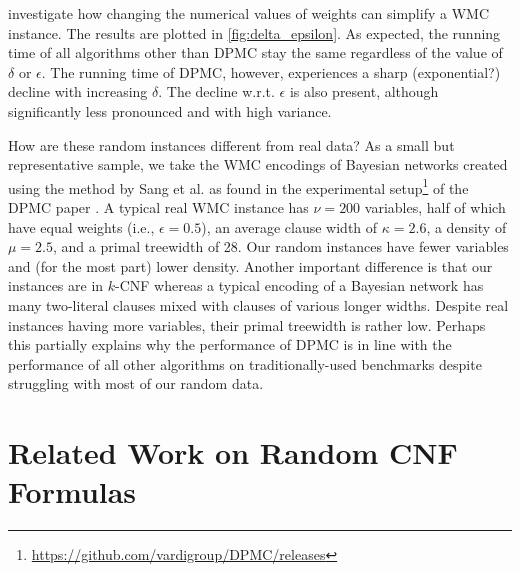 \documentclass{article}
\theoremstyle{definition}
\theoremstyle{remark}
\begin{document}
 investigate how changing the numerical values of
weights can simplify a \textsf{WMC} instance. The results are plotted in
\cref{fig:delta_epsilon}. As expected, the running time of all algorithms other
than \textsc{DPMC} \cite{DBLP:conf/cp/DudekPV20} stay the same regardless of the
value of $\delta$ or $\epsilon$. The running time of \textsc{DPMC}, however,
experiences a sharp (exponential?) decline with increasing $\delta$. The decline
w.r.t. $\epsilon$ is also present, although significantly less
pronounced and with high variance.

How are these random instances different from real data? As a small but
representative sample, we take the \textsf{WMC} encodings of Bayesian networks
created using the method by Sang et al. \cite{DBLP:conf/aaai/SangBK05} as found
in the experimental
setup\footnote{\url{https://github.com/vardigroup/DPMC/releases}} of the
\textsc{DPMC} paper \cite{DBLP:conf/cp/DudekPV20}. A typical real \textsf{WMC}
instance has $\nu = 200$ variables, half of which have equal weights (i.e.,
$\epsilon = 0.5$), an average clause width of $\kappa = 2.6$, a density of $\mu
= 2.5$, and a primal treewidth of 28. Our random instances have fewer variables
and (for the most part) lower density. Another important difference is that our
instances are in $k$-CNF whereas a typical encoding of a Bayesian network has
many two-literal clauses mixed with clauses of various longer widths. Despite
real instances having more variables, their primal treewidth is rather low.
Perhaps this partially explains why the performance of \textsc{DPMC} is in line
with the performance of all other algorithms on traditionally-used benchmarks
\cite{DBLP:conf/cp/DudekPV20} despite struggling with most of our random data.

\section{Related Work on Random CNF Formulas}

\end{document}
